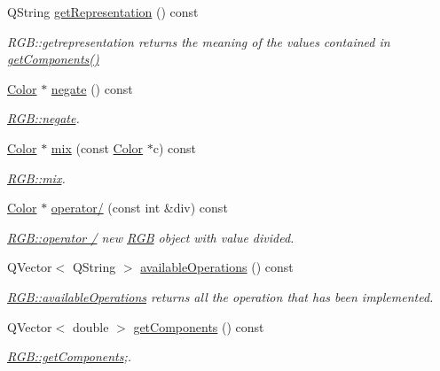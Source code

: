 \begin{DoxyCompactItemize}
Q\+String \hyperlink{class_r_g_b_a5f7a68904e1e4f18c22c1066170fb2bf}{get\+Representation} () const
\begin{DoxyCompactList}\small\item\em R\+G\+B\+::getrepresentation returns the meaning of the values contained in \hyperlink{class_r_g_b_ad085d3bd654d874ea2e5739a5c216769}{get\+Components()} \end{DoxyCompactList}\item 
\hyperlink{class_color}{Color} $\ast$ \hyperlink{class_r_g_b_a7aad38ac17ec3201c65f8f5e90637b69}{negate} () const
\begin{DoxyCompactList}\small\item\em \hyperlink{class_r_g_b_a7aad38ac17ec3201c65f8f5e90637b69}{R\+G\+B\+::negate}. \end{DoxyCompactList}\item 
\hyperlink{class_color}{Color} $\ast$ \hyperlink{class_r_g_b_aa022866e33474ab64f81d367c6b030b9}{mix} (const \hyperlink{class_color}{Color} $\ast$c) const
\begin{DoxyCompactList}\small\item\em \hyperlink{class_r_g_b_aa022866e33474ab64f81d367c6b030b9}{R\+G\+B\+::mix}. \end{DoxyCompactList}\item 
\hyperlink{class_color}{Color} $\ast$ \hyperlink{class_r_g_b_a9d250e0f58e7ae7d4c69ced724da6f80}{operator/} (const int \&div) const
\begin{DoxyCompactList}\small\item\em \hyperlink{class_r_g_b_a9d250e0f58e7ae7d4c69ced724da6f80}{R\+G\+B\+::operator /} new \hyperlink{class_r_g_b}{R\+GB} object with value divided. \end{DoxyCompactList}\item 
Q\+Vector$<$ Q\+String $>$ \hyperlink{class_r_g_b_a6cde5a9d00036c76fef2dd51ca8256a4}{available\+Operations} () const
\begin{DoxyCompactList}\small\item\em \hyperlink{class_r_g_b_a6cde5a9d00036c76fef2dd51ca8256a4}{R\+G\+B\+::available\+Operations} returns all the operation that has been implemented. \end{DoxyCompactList}\item 
Q\+Vector$<$ double $>$ \hyperlink{class_r_g_b_ad085d3bd654d874ea2e5739a5c216769}{get\+Components} () const
\begin{DoxyCompactList}\small\item\em \hyperlink{class_r_g_b_ad085d3bd654d874ea2e5739a5c216769}{R\+G\+B\+::get\+Components};. \end{DoxyCompactList}\item 

\end{DoxyCompactItemize}
